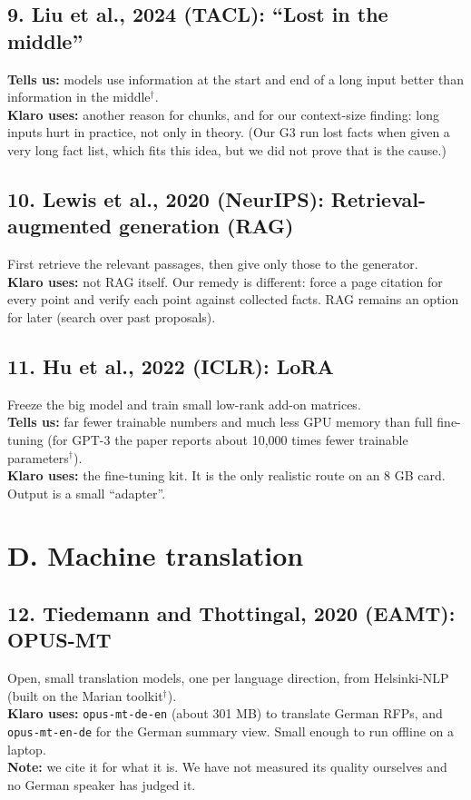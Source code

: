 \subsection*{9. Liu et al., 2024 (TACL): ``Lost in the middle''}
\textbf{Tells us:} models use information at the start and end of a long input better than information in the middle$^\dagger$.\\
\textbf{Klaro uses:} another reason for chunks, and for our context-size finding: long inputs hurt in practice, not only in theory. (Our G3 run lost facts when given a very long fact list, which fits this idea, but we did not prove that is the cause.)

\subsection*{10. Lewis et al., 2020 (NeurIPS): Retrieval-augmented generation (RAG)}
First retrieve the relevant passages, then give only those to the generator.\\
\textbf{Klaro uses:} not RAG itself. Our remedy is different: force a page citation for every point and verify each point against collected facts. RAG remains an option for later (search over past proposals).

\subsection*{11. Hu et al., 2022 (ICLR): LoRA}
Freeze the big model and train small low-rank add-on matrices.\\
\textbf{Tells us:} far fewer trainable numbers and much less GPU memory than full fine-tuning (for GPT-3 the paper reports about 10,000 times fewer trainable parameters$^\dagger$).\\
\textbf{Klaro uses:} the fine-tuning kit. It is the only realistic route on an 8 GB card. Output is a small ``adapter''.

\section{D. Machine translation}

\subsection*{12. Tiedemann and Thottingal, 2020 (EAMT): OPUS-MT}
Open, small translation models, one per language direction, from Helsinki-NLP (built on the Marian toolkit$^\dagger$).\\
\textbf{Klaro uses:} \texttt{opus-mt-de-en} (about 301 MB) to translate German RFPs, and \texttt{opus-mt-en-de} for the German summary view. Small enough to run offline on a laptop.\\
\textbf{Note:} we cite it for what it is. We have not measured its quality ourselves and no German speaker has judged it.

